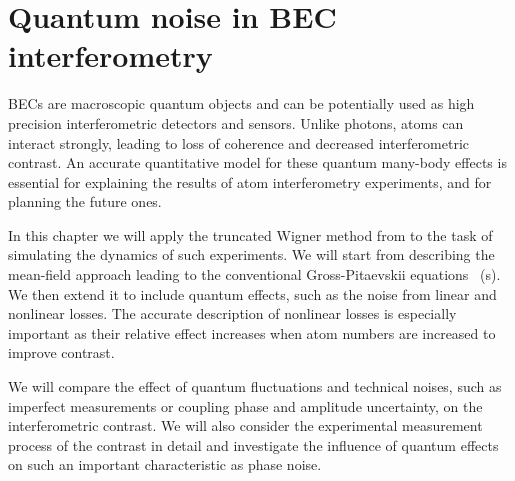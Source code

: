 \chapter{Quantum noise in BEC interferometry}
\label{cha:bec-noise}

BECs are macroscopic quantum objects and can be potentially used as high precision interferometric detectors and sensors.
Unlike photons, atoms can interact strongly, leading to loss of coherence and decreased interferometric contrast.
An accurate quantitative model for these quantum many-body effects is essential for explaining the results of atom interferometry experiments, and for planning the future ones.

In this chapter we will apply the truncated Wigner method from  to the task of simulating the dynamics of such experiments.
We will start from describing the mean-field approach leading to the conventional Gross-Pitaevskii equations~\cite{Pitaevskii2003} (s).
We then extend it to include quantum effects, such as the noise from linear and nonlinear losses.
The accurate description of nonlinear losses is especially important as their relative effect increases when atom numbers are increased to improve contrast.

We will compare the effect of quantum fluctuations and technical noises, such as imperfect measurements or coupling phase and amplitude uncertainty, on the interferometric contrast.
We will also consider the experimental measurement process of the contrast in detail and investigate the influence of quantum effects on such an important characteristic as phase noise.







